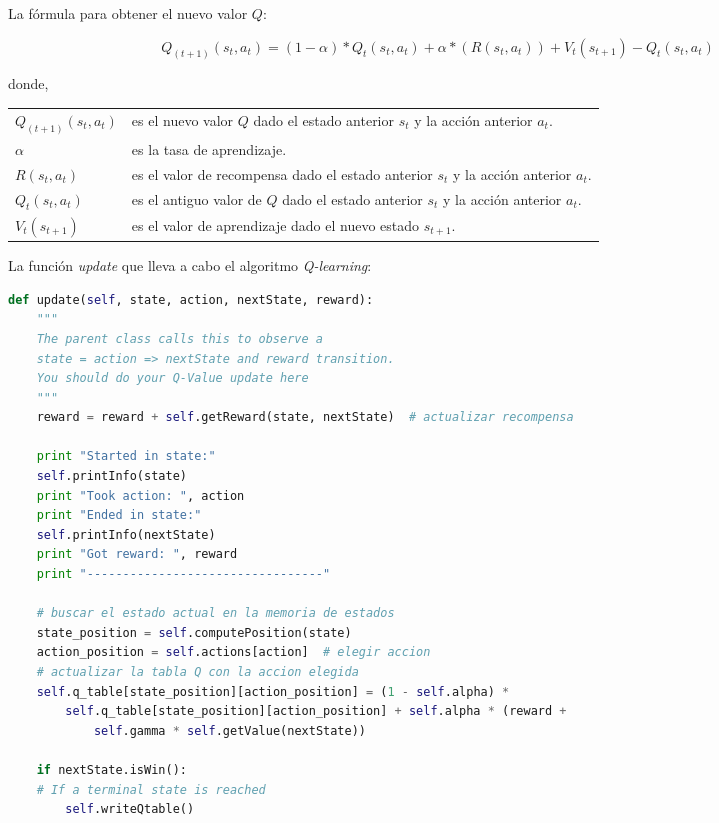 \documentclass[11pt]{exam}
\makeatletter
\newenvironment{conditions}
{\par\vspace{\abovedisplayskip}\noindent\begin{tabular}{>{$}l<{$} @{${}\:{}$} l}}
	{\end{tabular}\par\vspace{\belowdisplayskip}}
\makeatother
\begin{document}
\newpage

La fórmula para obtener el nuevo valor $Q$:

\begin{equation}\label{formula}
	Q_{(t+1)}(s_{t},a_{t}) = (1-\alpha) * Q_{t}(s_{t},a_{t}) + \alpha * (R(s_{t},a_{t})) + V_{t}(s_{t+1}) - Q_{t}(s_{t},a_{t})
\end{equation}

donde,

\begin{conditions}
	Q_{(t+1)}(s_{t},a_{t}) & es el nuevo valor $Q$ dado el estado anterior $s_{t}$ y la acción anterior $a_{t}$. \\
	\alpha & es la tasa de aprendizaje. \\
	R(s_{t},a_{t}) & es el valor de recompensa dado el estado anterior $s_{t}$ y la acción anterior $a_{t}$.	\\
	Q_{t}(s_{t},a_{t}) & es el antiguo valor de $Q$ dado el estado anterior $s_{t}$ y la acción anterior $a_{t}$.	\\
	V_{t}(s_{t+1}) & es el valor de aprendizaje dado el nuevo estado $s_{t+1}$.
\end{conditions}

La función \textit{update} que lleva a cabo el algoritmo \textit{Q-learning}:
\vspace*{3mm}

\begin{lstlisting}[caption={Función update.}, label={update}, language=python, basicstyle=\footnotesize]
def update(self, state, action, nextState, reward):
	"""
	The parent class calls this to observe a
	state = action => nextState and reward transition.
	You should do your Q-Value update here
	"""
	reward = reward + self.getReward(state, nextState)  # actualizar recompensa
	
	print "Started in state:"
	self.printInfo(state)
	print "Took action: ", action
	print "Ended in state:"
	self.printInfo(nextState)
	print "Got reward: ", reward
	print "---------------------------------"

	# buscar el estado actual en la memoria de estados
	state_position = self.computePosition(state)
	action_position = self.actions[action]  # elegir accion
	# actualizar la tabla Q con la accion elegida
	self.q_table[state_position][action_position] = (1 - self.alpha) * 
		self.q_table[state_position][action_position] + self.alpha * (reward + 
			self.gamma * self.getValue(nextState))

	if nextState.isWin():
	# If a terminal state is reached
		self.writeQtable()
\end{lstlisting}
\end{document}
